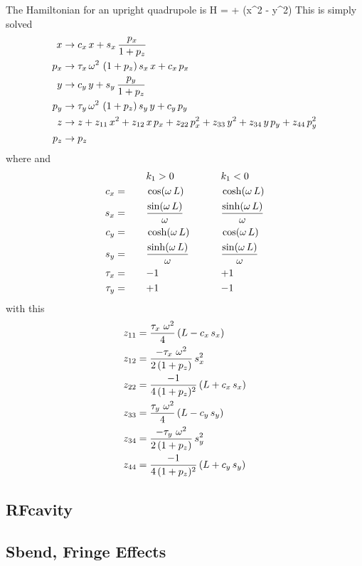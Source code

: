\documentclass{book}
\begin{document}
The Hamiltonian for an upright quadrupole is
\Begineq
  H =  +  (x^2 - y^2)
\Endeq
This is simply solved
\begin{align}
  x   &\rightarrow c_x \, x + s_x \, \frac{p_x}{1 + p_z} \nonumber \\
  p_x &\rightarrow \tau_x \, \omega^2 \, \, (1 + p_z) \, s_x \, x + c_x \, p_x \nonumber \\
  y   &\rightarrow c_y \, y + s_y \, \frac{p_y}{1 + p_z} \nonumber \\
  p_y &\rightarrow \tau_y \, \omega^2 \, \, (1 + p_z) \, s_y \, y + c_y \, p_y \nonumber \\
  z   &\rightarrow z + z_{11} \, x^2 + z_{12} \, x \, p_x + z_{22} \, p_x^2 + 
                   z_{33} \, y^2 + z_{34} \, y \, p_y + z_{44} \, p_y^2 \nonumber \\
  p_z &\rightarrow p_z \nonumber
\end{align}
where 
\Begineq
  \om \equiv {}
\Endeq
and
\begin{alignat}{3}
         &\hspace*{5ex}  && k_1 > 0          &\hspace*{5ex}& k_1 < 0 \nonumber \\
     c_x &=   && \cos  (\omega \, L) && \cosh (\omega \, L) \nonumber \\
     s_x &=   && \frac{\sin  (\omega \, L)}{\omega} && \frac{\sinh (\omega \, L)}{\omega} \nonumber \\
     c_y &=   && \cosh (\omega \, L) && \cos  (\omega \, L) \\
     s_y &=   && \frac{\sinh (\omega \, L)}{\omega} && \frac{\sin  (\omega \, L)}{\omega} \nonumber \\
  \tau_x &=   && {-}1             && {+}1             \nonumber \\
  \tau_y &=   && {+}1             && {-}1             \nonumber
\end{alignat}
with this
\begin{align}
  z_{11} &= \frac{\tau_x \,\, \omega^2}{4} \, (L - c_x \, s_x) \nonumber \\
  z_{12} &= \frac{-\tau_x \,\, \omega^2}{2 \, (1 + p_z)} \, s_x^2 \nonumber \\
  z_{22} &= \frac{-1}{4 \, (1 + p_z)^2} \, (L + c_x \, s_x) \nonumber \\
  z_{33} &= \frac{\tau_y \,\, \omega^2}{4} \, (L - c_y \, s_y) \nonumber \\
  z_{34} &= \frac{-\tau_y \,\, \omega^2}{2 \, (1 + p_z)} \, s_y^2 \nonumber \\
  z_{44} &= \frac{-1}{4 \, (1 + p_z)^2} \, (L + c_y \, s_y) \nonumber
\end{align}


\subsection{RFcavity}

\subsection{Sbend, Fringe Effects}
\end{document}
